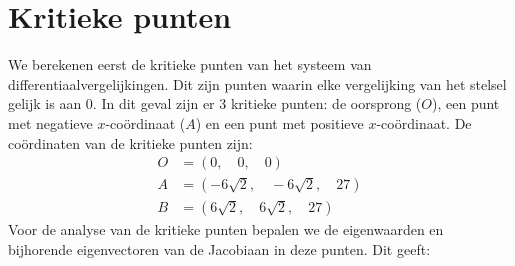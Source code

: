\documentclass[12pt, a4paper]{article}
\theoremstyle{definition}
\begin{document}
\section{Kritieke punten}
We berekenen eerst de kritieke punten van het systeem van differentiaalvergelijkingen. Dit zijn punten waarin elke vergelijking van het stelsel gelijk is aan 0. In dit geval zijn er 3 kritieke punten: de oorsprong ($O$), een punt met negatieve $x$-coördinaat ($A$) en een punt met positieve $x$-coördinaat. De coördinaten van de kritieke punten zijn:
\begin{align*}
    O &= \left ( 0, \quad 0, \quad 0\right )\\
    A &= \left ( - 6 \sqrt{2}, \quad - 6 \sqrt{2}, \quad 27\right )\\
    B &= \left ( 6 \sqrt{2}, \quad 6 \sqrt{2}, \quad 27\right )
\end{align*}
Voor de analyse van de kritieke punten bepalen we de eigenwaarden en bijhorende eigenvectoren van de Jacobiaan in deze punten. Dit geeft:
\end{document}

